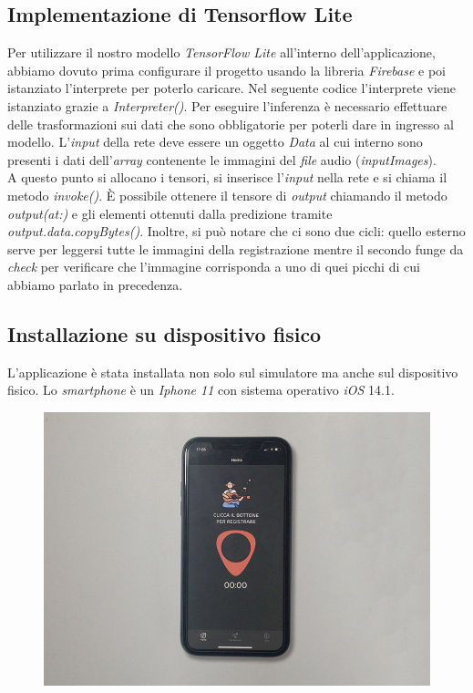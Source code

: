 \subsection{Implementazione di Tensorflow Lite}
Per utilizzare il nostro modello \textit{TensorFlow Lite} all'interno dell'applicazione, abbiamo dovuto prima configurare il progetto usando la libreria \textit{Firebase} e poi istanziato l'interprete per poterlo caricare. Nel seguente codice l'interprete viene istanziato grazie a \textit{Interpreter()}.
\vspace*{2ex}
\vspace*{2ex}
\noindent Per eseguire l'inferenza è necessario effettuare delle trasformazioni sui dati che sono obbligatorie per poterli dare in ingresso al modello. L'\textit{input} della rete deve essere un oggetto \textit{Data} al cui interno sono presenti i dati dell'\textit{array} contenente le immagini del \textit{file} audio (\textit{inputImages}).\\
A questo punto si allocano i tensori, si inserisce l'\textit{input} nella rete e si chiama il metodo \textit{invoke()}.
È possibile ottenere il tensore di \textit{output} chiamando il metodo \textit{output(at:)} e gli elementi ottenuti dalla predizione tramite \textit{output.data.copyBytes()}. Inoltre, si può notare che ci sono due cicli: quello esterno serve per leggersi tutte le immagini della registrazione mentre il secondo funge da \textit{check} per verificare che l'immagine corrisponda a uno di quei picchi di cui abbiamo parlato in precedenza.
\vspace*{2ex}
\subsection{Installazione su dispositivo fisico}
L'applicazione è stata installata non solo sul simulatore ma anche sul dispositivo fisico. Lo \textit{smartphone} è un \textit{Iphone 11} con sistema operativo \textit{iOS} 14.1.
\begin{figure}[H]
	\centering
	\includegraphics[scale=0.40]{./images/img21.jpg}
\end{figure}